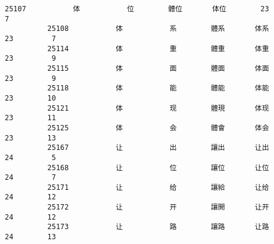 \documentclass[11pt]{article}
\begin{document}
\begin{Verbatim}[commandchars=\\\{\}]
          25107           体           位        體位       体位        23         7   
          25108           体           系        體系       体系        23         7   
          25114           体           重        體重       体重        23         9   
          25115           体           面        體面       体面        23         9   
          25118           体           能        體能       体能        23        10   
          25121           体           现        體現       体现        23        11   
          25125           体           会        體會       体会        23        13   
          25167           让           出        讓出       让出        24         5   
          25168           让           位        讓位       让位        24         7   
          25171           让           给        讓給       让给        24        12   
          25172           让           开        讓開       让开        24        12   
          25173           让           路        讓路       让路        24        13   
          

\end{Verbatim}
\end{document}
